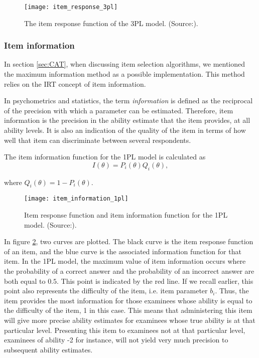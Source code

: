 \begin{figure}[H]
\centering
\texttt{[image: item\_response\_3pl]}
\caption{The item response function of the 3PL model. (Source:\cite{Visual-IRT}).}
\label{fig:item_response_3pl}
\end{figure}

\subsubsection{Item information}
In section \ref{sec:CAT}, when discussing item selection algorithms, we mentioned the maximum information method as a possible implementation. This method relies on the IRT concept of item information.\newline

In psychometrics and statistics, the term \textit{information} is defined as the reciprocal of the precision with which a parameter can be estimated\cite{Basics-IRT}. Therefore, item information is the precision in the ability estimate that the item provides, at all ability levels. It is also an indication of the quality of the item in terms of how well that item can discriminate between several respondents. \newline

The item information function for the 1PL model is calculated as
$$I(\theta) = P_i(\theta)Q_i(\theta),$$

where $Q_i(\theta) = 1-P_i(\theta)$.

\begin{figure}[H]
\centering
\texttt{[image: item\_information\_1pl]}
\caption{Item response function and item information
function for the 1PL model. (Source:\cite{Visual-IRT}).}
\label{fig:item_information_1pl}
\end{figure}

In figure \ref{fig:item_information_1pl}, two curves are plotted. The black curve is the item response function of an item, and the blue curve is the associated information function for that item. In the 1PL model, the maximum value of item information occurs where the probability of a correct answer and the probability of an incorrect answer are both equal to $0.5$. This point is indicated by the red line. If we recall earlier, this point also represents the difficulty of the item, i.e. item parameter $b_i$. Thus, the item provides the most information for those examinees whose ability is equal to the difficulty of the item, 1 in this case. This means that administering this item will give more precise ability estimates for examinees whose true ability is at that particular level. Presenting this item to examinees not at that particular level, examinees of ability -2 for instance, will not yield very much precision to subsequent ability estimates. \newline

